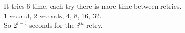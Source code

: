 It tries 6 time, each try there is more time between retries.\\
1 second, 2 seconds, 4, 8, 16, 32.\\
So $2^{i-1}$ seconds for the $i^{th}$ retry.